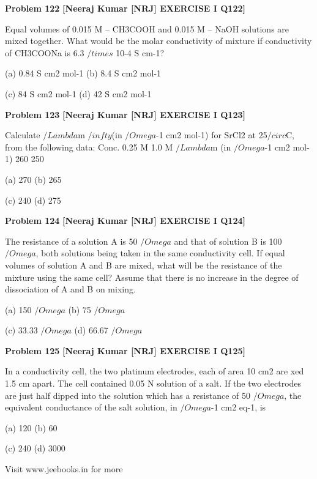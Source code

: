 \begin{problembox}
\textbf{Problem 122} \hfill \textbf{[Neeraj Kumar [NRJ] EXERCISE I Q122]}
\label{q:ext-nrj_all_questions-122}

Equal volumes of 0.015 M -- CH3COOH and 
0.015 M -- NaOH solutions are mixed together. 
What would be the molar conductivity of mixture 
if conductivity of CH3COONa is 6.3 $/times$ 10-4 
S cm-1?
 
 (a) 0.84 S cm2 mol-1 
(b) 8.4 S cm2 mol-1
 
 (c) 84 S cm2 mol-1 
(d) 42 S cm2 mol-1
\end{problembox}

\begin{problembox}
\textbf{Problem 123} \hfill \textbf{[Neeraj Kumar [NRJ] EXERCISE I Q123]}
\label{q:ext-nrj_all_questions-123}

Calculate $/Lambda$m
$/infty$(in $/Omega$-1 cm2 mol-1) for SrCl2 at 25$/circ$C, 
from the following data:
Conc.
0.25 M
1.0 M
$/Lambda$m (in $/Omega$-1 cm2 mol-1)
260
250
 
 (a) 270 
(b) 265
 
 (c) 240 
(d) 275
\end{problembox}

\begin{problembox}
\textbf{Problem 124} \hfill \textbf{[Neeraj Kumar [NRJ] EXERCISE I Q124]}
\label{q:ext-nrj_all_questions-124}

The resistance of a solution A is 50 $/Omega$ and that 
of solution B is 100 $/Omega$, both solutions being taken 
in the same conductivity cell. If equal volumes 
of solution A and B are mixed, what will be the 
resistance of the mixture using the same cell? 
Assume that there is no increase in the degree of 
dissociation of A and B on mixing.
 
 (a) 150 $/Omega$ 
(b) 75 $/Omega$
 
 (c) 33.33 $/Omega$ 
(d) 66.67 $/Omega$
\end{problembox}

\begin{problembox}
\textbf{Problem 125} \hfill \textbf{[Neeraj Kumar [NRJ] EXERCISE I Q125]}
\label{q:ext-nrj_all_questions-125}

In a conductivity cell, the two platinum electrodes, 
each of area 10 cm2 are   xed 1.5 cm apart. The 
cell contained 0.05 N solution of a salt. If the two 
electrodes are just half dipped into the solution 
which has a resistance of 50 $/Omega$, the equivalent 
conductance of the salt solution, in $/Omega$-1 cm2 eq-1, is
 
 (a) 120 
(b) 60
 
 (c) 240 
(d) 3000
 
 
Visit www.jeebooks.in for more
\end{problembox}

